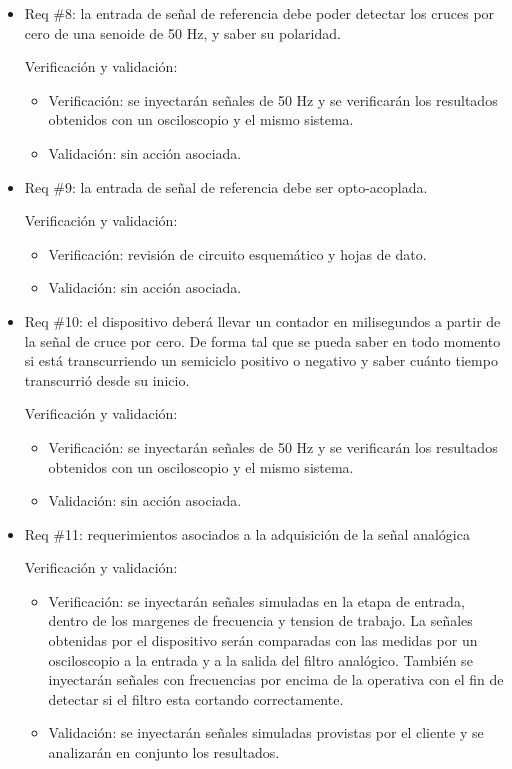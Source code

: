 \documentclass[11pt]{charter}
\begin{document}
\begin{itemize}
\item Req \#8: la entrada de señal de referencia debe poder detectar los cruces por cero de una senoide de 50 Hz, y saber su polaridad.

Verificación y validación:

\begin{itemize}
\item Verificación: se inyectarán señales de 50 Hz y se verificarán los resultados obtenidos con un osciloscopio y el mismo sistema.
\item Validación: sin acción asociada.
\end{itemize}

\item Req \#9: la entrada de señal de referencia debe ser opto-acoplada.

Verificación y validación:

\begin{itemize}
\item Verificación: revisión de circuito esquemático y hojas de dato.
\item Validación: sin acción asociada. 
\end{itemize}

\item Req \#10: el dispositivo deberá llevar un contador en milisegundos a partir de la señal de cruce por cero. De forma tal que se pueda saber en todo momento si está transcurriendo un semiciclo positivo o negativo y saber cuánto tiempo transcurrió desde su inicio.

Verificación y validación:

\begin{itemize}
\item Verificación: se inyectarán señales de 50 Hz y se verificarán los resultados obtenidos con un osciloscopio y el mismo sistema.
\item Validación: sin acción asociada.
\end{itemize}

\item Req \#11: requerimientos asociados a la adquisición de la señal analógica

Verificación y validación:

\begin{itemize}
\item Verificación: se inyectarán señales simuladas en la etapa de entrada, dentro de los margenes de frecuencia y tension de trabajo. La señales obtenidas por el dispositivo serán comparadas con las medidas por un osciloscopio a la entrada y a la salida del filtro analógico. También se inyectarán señales con frecuencias por encima de la operativa con el fin de detectar si el filtro esta cortando correctamente.
\item Validación: se inyectarán señales simuladas provistas por el cliente y se analizarán en conjunto los resultados.
\end{itemize}


\end{itemize}
\end{document}
